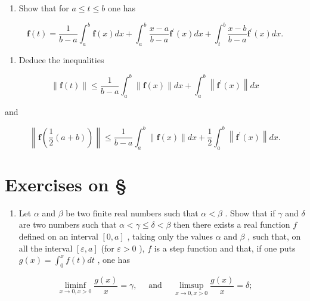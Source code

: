 \begin{enumerate}
\def\labelenumi{\alph{enumi})}
\tightlist
\item
  Show that for \(a \leqslant t \leqslant b\) one has
\end{enumerate}

\[
\mathbf {f} (t) = \frac {1}{b - a} \int_ {a} ^ {b} \mathbf {f} (x) d x + \int_ {a} ^ {b} \frac {x - a}{b - a} \mathbf {f} ^ {\prime} (x) d x + \int_ {t} ^ {b} \frac {x - b}{b - a} \mathbf {f} ^ {\prime} (x) d x.
\]

\begin{enumerate}
\def\labelenumi{\alph{enumi})}
\setcounter{enumi}{1}
\tightlist
\item
  Deduce the inequalities
\end{enumerate}

\[
\| \mathbf {f} (t) \| \leqslant \frac {1}{b - a} \int_ {a} ^ {b} \| \mathbf {f} (x) \| d x + \int_ {a} ^ {b} \left\| \mathbf {f} ^ {\prime} (x) \right\| d x
\]

and

\[
\left\| \mathbf {f} \left(\frac {1}{2} (a + b)\right) \right\| \leqslant \frac {1}{b - a} \int_ {a} ^ {b} \| \mathbf {f} (x) \| d x + \frac {1}{2} \int_ {a} ^ {b} \left\| \mathbf {f} ^ {\prime} (x) \right\| d x.
\]

\setcounter{exercisegroup}{1}
\section*{Exercises on \S{}}
{}

\begin{enumerate}
\def\labelenumi{\arabic{enumi})}
\tightlist
\item
  Let \(\alpha\) and \(\beta\) be two finite real numbers such that \(\alpha < \beta\) . Show that if \(\gamma\) and \(\delta\) are two numbers such that \(\alpha < \gamma \leqslant \delta < \beta\) then there exists a real function \(f\) defined on an interval \([0, a]\) , taking only the values \(\alpha\) and \(\beta\) , such that, on all the interval \([\varepsilon, a]\) (for \(\varepsilon > 0\) ), \(f\) is a step function and that, if one puts \(g(x) = \int_0^x f(t)dt\) , one has
\end{enumerate}

\[
\liminf _ {x \to 0,   x > 0} \frac {g (x)}{x} = \gamma , \quad \text { and } \quad \limsup _ {x \to 0,   x > 0} \frac {g (x)}{x} = \delta ;\tag{*}
\]

